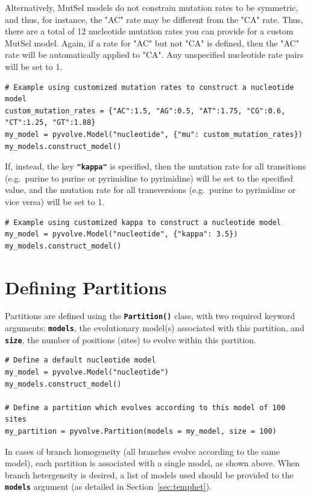 \documentclass{article}
\newcommand{\code}[1]{\textbf{\texttt{\small{#1}}}}
\begin{document}
Alternatively, MutSel models do not constrain mutation rates to be symmetric, and thus, for instance, the "AC" rate may be different from the "CA" rate. Thus, there are a total of 12 nucleotide mutation rates you can provide for a custom MutSel model. Again, if a rate for "AC" but not "CA" is defined, then the "AC" rate will be automatically applied to "CA". Any unspecified nucleotide rate pairs will be set to 1. 
\begin{lstlisting}
# Example using customized mutation rates to construct a nucleotide model
custom_mutation_rates = {"AC":1.5, "AG":0.5, "AT":1.75, "CG":0.6, "CT":1.25, "GT":1.88}
my_model = pyvolve.Model("nucleotide", {"mu": custom_mutation_rates})
my_models.construct_model()
\end{lstlisting}

If, instead, the key \code{"kappa"} is specified, then the mutation rate for all transitions (e.g.\ purine to purine or pyrimidine to pyrimidine) will be set to the specified value, and the mutation rate for all transversions (e.g.\ purine to pyrimidine or vice versa) will be set to 1.
\begin{lstlisting}
# Example using customized kappa to construct a nucleotide model
my_model = pyvolve.Model("nucleotide", {"kappa": 3.5})
my_models.construct_model()
\end{lstlisting}


\section{Defining Partitions}\label{sec:partitions}

Partitions are defined using the \code{Partition()} class, with two required keyword arguments: \code{models}, the evolutionary model(s) associated with this partition, and \code{size}, the number of positions (sites) to evolve within this partition.
\begin{lstlisting}
# Define a default nucleotide model
my_model = pyvolve.Model("nucleotide")
my_models.construct_model()

# Define a partition which evolves according to this model of 100 sites
my_partition = pyvolve.Partition(models = my_model, size = 100)
\end{lstlisting}

In cases of branch homogeneity (all branches evolve according to the same model), each partition is associated with a single model, as shown above. When branch hetergeneity is desired, a list of models used should be provided to the \code{models} argument (as detailed in Section~\ref{sec:temphet}).
\end{document}
